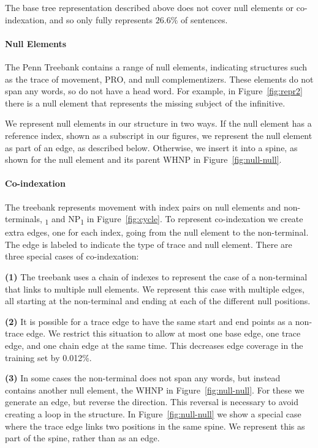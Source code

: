 The base tree representation described above does not cover null elements or co-indexation, and so only fully represents $26.6\%$ of sentences.

\paragraph{Null Elements}
The Penn Treebank contains a range of null elements, indicating structures such as the trace of movement, PRO, and null complementizers.
These elements do not span any words, so do not have a head word.
For example, in Figure~\ref{fig:repr2} there is a null element that represents the missing subject of the infinitive.

We represent null elements in our structure in two ways.
If the null element has a reference index, shown as a subscript in our figures, we represent the null element as part of an edge, as described below.
Otherwise, we insert it into a spine, as shown for the null element and its parent WHNP in Figure~\ref{fig:null-null}.

\paragraph{Co-indexation}
The treebank represents movement with index pairs on null elements and non-terminals, \myeg *\textsubscript{1} and NP\textsubscript{1} in Figure~\ref{fig:cycle}.
To represent co-indexation we create extra edges, one for each index, going from the null element to the non-terminal.
The edge is labeled to indicate the type of trace and null element.
There are three special cases of co-indexation:

\textbf{(1)}
The treebank uses a chain of indexes to represent the case of a non-terminal that links to multiple null elements.
We represent this case with multiple edges, all starting at the non-terminal and ending at each of the different null positions.

\textbf{(2)}
It is possible for a trace edge to have the same start and end points as a non-trace edge.
We restrict this situation to allow at most one base edge, one trace edge, and one chain edge at the same time.
This decreases edge coverage in the training set by 0.012\%.

\textbf{(3)}
In some cases the non-terminal does not span any words, but instead contains another null element, \myeg the WHNP in Figure~\ref{fig:null-null}.
For these we generate an edge, but reverse the direction.
This reversal is necessary to avoid creating a loop in the structure.
In Figure~\ref{fig:null-null} we show a special case where the trace edge links two positions in the same spine.
We represent this as part of the spine, rather than as an edge.

